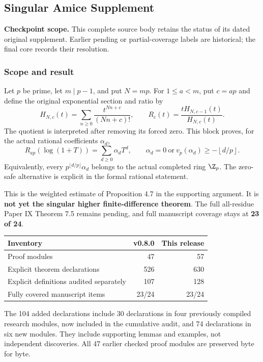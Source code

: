 \clearpage\subsection{Singular Amice Supplement}\label{app:sup9}
\noindent\textbf{Checkpoint scope.} This complete source body retains the status of its dated original supplement. Earlier pending or partial-coverage labels are historical; the final core records their resolution.\par\medskip
\subsubsection*{Scope and result}
Let $p$ be prime, let $m\mid p-1$, and put $N=mp$. For $1\le a<m$, put $c=ap$ and define the original exponential section and ratio by
\[
 H_{N,c}(t)=\sum_{n\ge0}\frac{t^{Nn+c}}{(Nn+c)!},\qquad
 R_c(t)=\frac{tH_{N,c-1}(t)}{H_{N,c}(t)}.
\]
The quotient is interpreted after removing its forced zero. This block proves, for the actual rational coefficients $\alpha_d$,
\[
 R_{ap}(\log(1+T))=\sum_{d\ge0}\alpha_dT^d,
 \qquad
 \boxed{\alpha_d=0\ \text{or}\ v_p(\alpha_d)\ge-\left\lfloor d/p\right\rfloor.}
\]
Equivalently, every $p^{\lfloor d/p\rfloor}\alpha_d$ belongs to the actual completed ring $\Z_p$. The zero-safe alternative is explicit in the formal rational statement.

This is the weighted estimate of Proposition 4.7 in the supporting argument. It is \textbf{not yet the singular higher finite-difference theorem}. The full all-residue Paper IX Theorem 7.5 remains pending, and full manuscript coverage stays at \textbf{23 of 24}.

\begin{center}\begin{tabular}{lrr}\toprule
Inventory & v0.8.0 & This release\\\midrule
Proof modules &47&57\\
Explicit theorem declarations &526&630\\
Explicit definitions audited separately &107&128\\
Fully covered manuscript items &23/24&23/24\\\bottomrule
\end{tabular}\end{center}
The 104 added declarations include 30 declarations in four previously compiled research modules, now included in the cumulative audit, and 74 declarations in six new modules. They include supporting lemmas and examples, not independent discoveries. All 47 earlier checked proof modules are preserved byte for byte.

